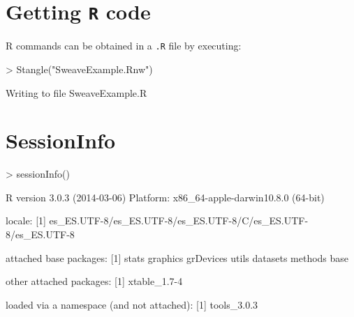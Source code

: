 \documentclass[11pt]{article}
\begin{document}
\section{Getting {\tt R} code}

\noindent R commands can be obtained in a {\tt .R} file by executing:

\begin{Schunk}
\begin{Sinput}
> Stangle("SweaveExample.Rnw")
\end{Sinput}
\begin{Soutput}
Writing to file SweaveExample.R 
\end{Soutput}
\end{Schunk}

\newpage
\section{SessionInfo}

\begin{Schunk}
\begin{Sinput}
>  sessionInfo()
\end{Sinput}
\begin{Soutput}
R version 3.0.3 (2014-03-06)
Platform: x86_64-apple-darwin10.8.0 (64-bit)

locale:
[1] es_ES.UTF-8/es_ES.UTF-8/es_ES.UTF-8/C/es_ES.UTF-8/es_ES.UTF-8

attached base packages:
[1] stats     graphics  grDevices utils     datasets  methods   base     

other attached packages:
[1] xtable_1.7-4

loaded via a namespace (and not attached):
[1] tools_3.0.3
\end{Soutput}
\end{Schunk}
 
\end{document}
